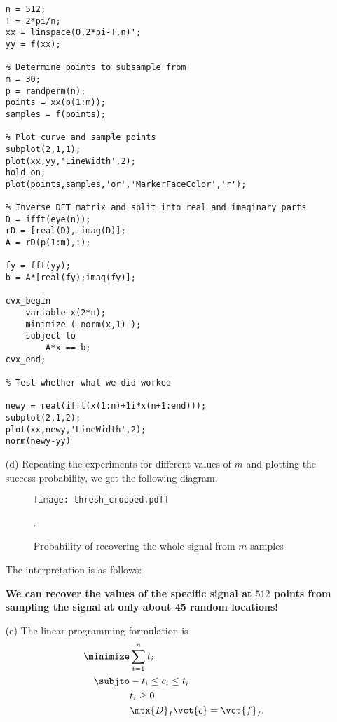 \documentclass{article}
\begin{document}
\begin{itemize}
{\begin{lstlisting}[frame=single]
% Set up vector f
n = 512;
T = 2*pi/n;
xx = linspace(0,2*pi-T,n)';
yy = f(xx);

% Determine points to subsample from
m = 30;
p = randperm(n);
points = xx(p(1:m));
samples = f(points);

% Plot curve and sample points
subplot(2,1,1);
plot(xx,yy,'LineWidth',2);
hold on;
plot(points,samples,'or','MarkerFaceColor','r');

% Inverse DFT matrix and split into real and imaginary parts
D = ifft(eye(n));
rD = [real(D),-imag(D)];
A = rD(p(1:m),:);

fy = fft(yy);
b = A*[real(fy);imag(fy)];

cvx_begin
    variable x(2*n);
    minimize ( norm(x,1) );
    subject to
        A*x == b;
cvx_end;

% Test whether what we did worked

newy = real(ifft(x(1:n)+1i*x(n+1:end)));
subplot(2,1,2);
plot(xx,newy,'LineWidth',2);
norm(newy-yy)
\end{lstlisting}}
\item[(d)] Repeating the experiments for different values of $m$ and plotting the success probability, we get the following diagram.
\begin{figure}[h!]
 \centering
 \texttt{[image: thresh\_cropped.pdf]}
\caption{Probability of recovering the whole signal from $m$ samples}.
 \end{figure}
The interpretation is as follows: 

{\bf We can  recover the values of the specific signal at $512$ points from sampling the signal at only about 45 random locations!}
\item[(e)] The linear programming formulation is
\begin{align*}
 \minimize & \sum_{i=1}^n t_i\\
 \subjto & -t_i\leq c_i\leq t_i\\
 & t_i\geq 0\\
 & \mtx{D}_I\vct{c}=\vct{f}_I.
\end{align*}

\end{itemize}
\end{document}

